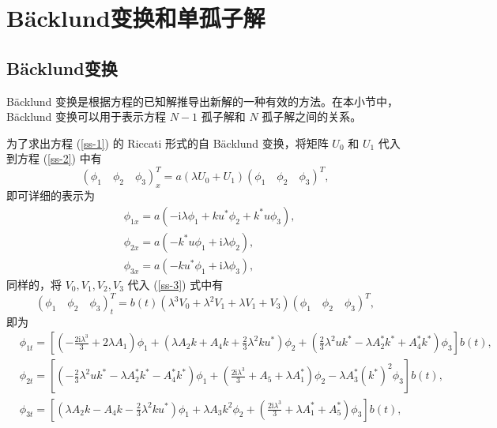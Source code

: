 \section{B\"acklund变换和单孤子解}
\subsection{B\"acklund变换}
B\"acklund 变换是根据方程的已知解推导出新解的一种有效的方法。在本小节中，B\"acklund 变换可以用于表示方程 $N - 1$ 孤子解和 $N$ 孤子解之间的关系。

为了求出方程 (\ref{ss-1}) 的 Riccati 形式的自 B\"{a}cklund 变换，将矩阵 $U_0$ 和 $U_1$ 代入到方程 (\ref{ss-2}) 中有
\begin{equation}
  (\phi_{1}\quad \phi_{2}\quad \phi_{3})_{x}^{T} = a(\lambda U_{0} + U_{1})(\phi_{1}\quad \phi_{2}\quad \phi_{3})^{T},
\end{equation}
即可详细的表示为
\begin{align}
  & \phi_{1x} = a(-\mathrm{i}\lambda\phi_{1} + ku^{*}\phi_{2} +k^{*}u\phi_{3}), \label{ss-p1}\\
  & \phi_{2x} = a(-k^{*}u\phi_{1} + \mathrm{i}\lambda\phi_{2}), \\
  & \phi_{3x} = a(-ku^{*}\phi_{1} + \mathrm{i}\lambda\phi_{3}), \label{ss-p2}
\end{align}
同样的，将 $V_{0}, V_{1}, V_{2}, V_{3}$ 代入 (\ref{ss-3}) 式中有
\begin{equation}
  (\phi_{1}\quad \phi_{2} \quad \phi_{3})^{T}_{t} = b(t)(\lambda^{3}V_{0} + \lambda^{2}V_{1} + \lambda V_{1} + V_{3})(\phi_{1}\quad \phi_{2} \quad \phi_{3})^{T},
\end{equation}
即为
\begin{align}
  & \phi_{1t} = \left[\left(-\frac{2\mathrm{i}\lambda^{3}}{3}+2\lambda A_{1}\right)\phi_{1} + \left(\lambda A_{2}k+A_{4}k+\frac{2}{3}\lambda^{2}ku^{*}\right)\phi_{2} + \left(\frac{2}{3}\lambda^{2}uk^{*}-\lambda A_{2}^{*}k^{*}+A_{4}^{*}k^{*}\right)\phi_{3}\right]b(t), \label{ss-p3} \\
  & \phi_{2t} = \left[\left(-\frac{2}{3}\lambda^{2}uk^{*}-\lambda A_{2}^{*}k^{*}-A_{4}^{*}k^{*}\right)\phi_{1} + \left(\frac{2\mathrm{i}\lambda^{3}}{3}+A_{5}+\lambda A_{1}^{*}\right)\phi_{2} - \lambda A_{3}^{*}(k^{*})^{2}\phi_{3}\right]b(t), \\
  & \phi_{3t} = \left[\left(\lambda A_{2}k-A_{4}k-\frac{2}{3}\lambda^{2}ku^{*}\right)\phi_{1} + \lambda A_{3}k^{2}\phi_{2} + \left(\frac{2\mathrm{i}\lambda^{3}}{3}+\lambda A_{1}^{*} + A_{5}^{*}\right)\phi_{3}\right]b(t), \label{ss-p4}
\end{align}
